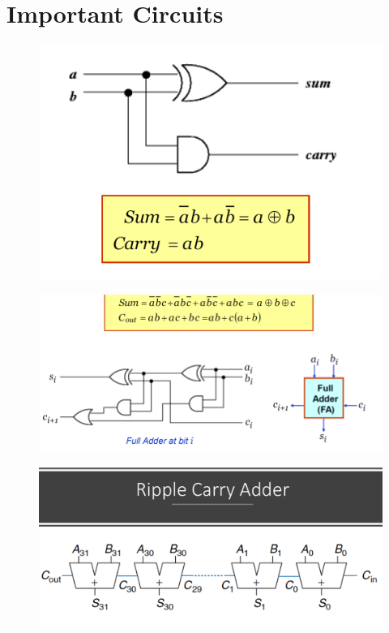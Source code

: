 \documentclass{article}[12pt]
\begin{document}
\section{Important Circuits}
\begin{figure}[htbp]
\centerline{\includegraphics[scale=0.3]{../Images/half-add.png}}
\end{figure}

\begin{figure}[htbp]
\centerline{\includegraphics[scale=0.3]{../Images/full-add.png}}
\end{figure}

\begin{figure}[htbp]
\centerline{\includegraphics[scale=0.3]{../Images/ripple-add.png}}
\end{figure}
\end{document}

